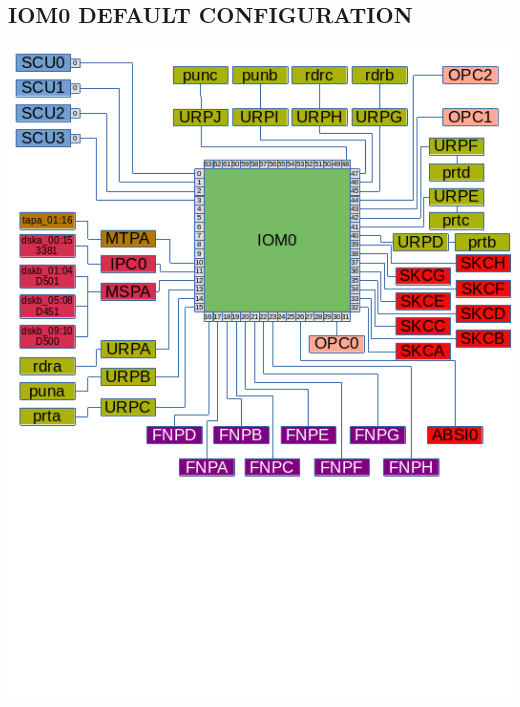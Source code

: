 \subsection[IOM0 Default Configuration]{IOM0 DEFAULT CONFIGURATION}
\begin{center}
    \includegraphics{DefaultCablingDiagram-IOM0.png}
\end{center}

